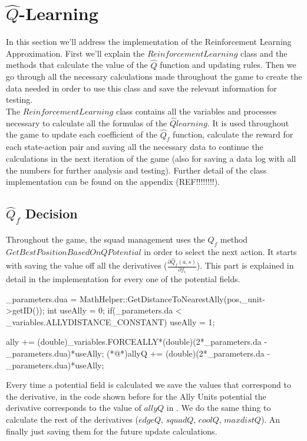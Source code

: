 \newpage
\section{$ \hat{Q}$-Learning}

In this section we'll address the implementation of the Reinforcement Learning Approximation. First we'll explain the $ReinforcementLearning$ class and the methods that calculate the value of the $\hat{Q}$ function and updating rules. Then we go through all the necessary calculations made throughout the game to create the data needed in order to use this class and save the relevant information for testing.\\

The $ReinforcementLearning$ class contains all the variables and processes necessary to calculate all the formulas of the $\hat{Q} learning$. It is used throughout the game to update each coefficient of the $\hat{Q}_f$ function, calculate the reward for each state-action pair and saving all the necessary data to continue the calculations in the next iteration of the game (also for saving a data log with all the numbers for further analysis and testing). Further detail of the class implementation can be found on the appendix (REF!!!!!!!!). 

\subsection{$\hat{Q}_f$ Decision}

Throughout the game, the squad management uses the $\hat{Q}_f$ method \\
$GetBestPositionBasedOnQPotential$ in order to select the next action. It starts with saving the value off all the derivatives ($\frac{\partial \hat{Q}_f(a,s)}{\partial f_i}$). This part is explained in detail in the implementation for every one of the potential fields. \\

\begin{Sourcecode}[caption=Ally units]
_parameters.dua = MathHelper::GetDistanceToNearestAlly(pos,_unit->getID());
int useAlly = 0;
if(_parameters.da < _variables.ALLYDISTANCE_CONSTANT)
	useAlly = 1;

ally += (double)_variables.FORCEALLY*(double)(2*_parameters.da - _parameters.dua)*useAlly;
(*@\lnote@*)allyQ += (double)(2*_parameters.da - _parameters.dua)*useAlly;
\end{Sourcecode}	

Every time a potential field is calculated we save the values that correspond to the derivative, in the code shown before for the Ally Units potential the derivative corresponds to the value of $allyQ$ in . We do the same thing to calculate the rest of the derivatives ($edgeQ$, $squadQ$, $coolQ$, $maxdistQ$). An finally just saving them for the future update calculations.\\ 

